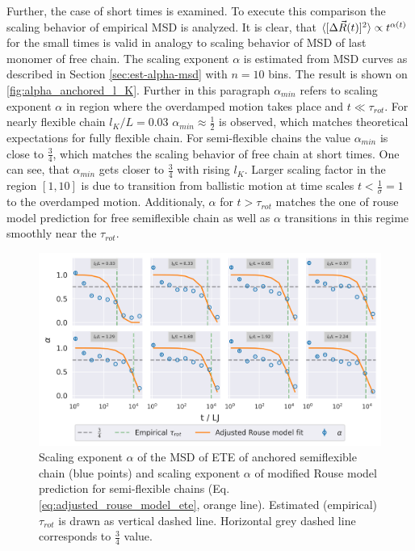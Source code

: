 \documentclass[
    paper=A4,pagesize=automedia,fontsize=12pt,
    BCOR=15mm,DIV=22,
    twoside,headinclude,footinclude=false,
    fleqn,             %
    bibliography=totocnumbered,          %
    listof=totoc,                %
    listof=flat,                 %
    cleardoublepage=empty      %
    numbers=endperiod
]{scrartcl}
\begin{document}
\vspace{0.5cm}
Further, the case of short times is examined. To execute this comparison
the scaling behavior of empirical MSD is analyzed. It is clear, that
$\langle[\Delta \vec{R}(t)]^2\rangle \propto t^{\alpha(t)}$ for the small times is valid
in analogy to scaling behavior of MSD of last monomer of free chain. 
The scaling exponent $\alpha$ is estimated from MSD curves as 
described in Section \ref{sec:est-alpha-msd} with $n=10$ bins. 
The result is shown on \autoref{fig:alpha_anchored_l_K}.
Further in this paragraph $\alpha_{min}$ refers to scaling exponent $\alpha$
in region where the overdamped motion takes place and $t \ll \tau_{rot}$. 
For nearly flexible chain $l_K/L = 0.03$ $\alpha_{min} \approx \frac{1}{2}$
is observed, which matches theoretical expectations for fully flexible chain.
For semi-flexible chains the value $\alpha_{min}$ is close to $\frac{3}{4}$, which
matches the scaling behavior of free chain at short times. 
One can see, that $\alpha_{min}$ gets closer to $\frac{3}{4}$ with rising $l_K$. Larger
scaling factor in the region $[1, 10]$ is due to transition from 
ballistic motion at time scales $t<\frac{1}{\sigma} = 1$ to the overdamped motion.
Additionaly, $\alpha$ for $t>\tau_{rot}$ matches the one of rouse model prediction
for free semiflexible chain as well as $\alpha$ transitions in this regime smoothly
near the $\tau_{rot}$.

\begin{figure}[h]
    \begin{center}
      \includegraphics[width=\columnwidth,trim={0cm 0cm 0cm 0.0cm},clip]{4-exp-delta_R-rouse_fit-tau-a_alpha.png}
      \caption{\label{fig:alpha_anchored_l_K}
      Scaling exponent $\alpha$ of the MSD of ETE of anchored semiflexible chain (blue points) and 
      scaling exponent $\alpha$ of modified Rouse model prediction for semi-flexible chains 
      (Eq.\ref{eq:adjusted_rouse_model_ete}, orange line).
      Estimated (empirical) $\tau_{rot}$ is drawn as vertical dashed line.
      Horizontal grey dashed line corresponds to $\frac{3}{4}$ value.
      }
    \end{center}
\end{figure}
\end{document}
